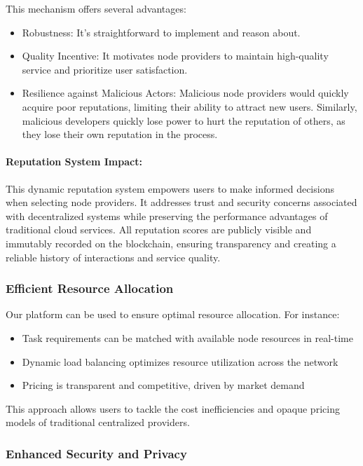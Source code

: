 This mechanism offers several advantages:

\begin{itemize}
    \item Robustness: It's straightforward to implement and reason about.
    \item Quality Incentive: It motivates node providers to maintain high-quality service and prioritize user satisfaction.
    \item Resilience against Malicious Actors: Malicious node providers would quickly acquire poor reputations, limiting their ability to attract new users. Similarly, malicious developers quickly lose power to hurt the reputation of others, as they lose their own reputation in the process.
\end{itemize}

\paragraph{Reputation System Impact:}

This dynamic reputation system empowers users to make informed decisions when selecting node providers. It addresses trust and security concerns associated with decentralized systems while preserving the performance advantages of traditional cloud services. All reputation scores are publicly visible and immutably recorded on the blockchain, ensuring transparency and creating a reliable history of interactions and service quality.

\subsubsection{Efficient Resource Allocation}

Our platform can be used to ensure optimal resource allocation. For instance:
\begin{itemize}
    \item Task requirements can be matched with available node resources in real-time
    \item Dynamic load balancing optimizes resource utilization across the network
    \item Pricing is transparent and competitive, driven by market demand
\end{itemize}

This approach allows users to tackle the cost inefficiencies and opaque pricing models of traditional centralized providers.

\subsubsection{Enhanced Security and Privacy}

